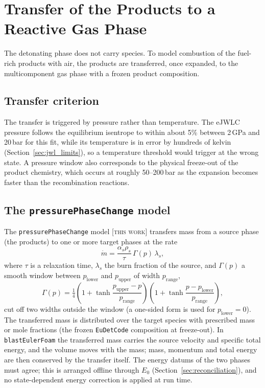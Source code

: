 \documentclass{article}
\newcommand{\tw}{\textsc{[this work]}}
\begin{document}
\section{Transfer of the Products to a Reactive Gas Phase}
\label{sec:transfer}

The detonating phase does not carry species. To model combustion of the fuel-rich products with air, the products are transferred, once expanded, to the multicomponent gas phase with a frozen product composition.

\subsection{Transfer criterion}

The transfer is triggered by pressure rather than temperature. The eJWLC pressure follows the equilibrium isentrope to within about 5\% between 2\,GPa and 20\,bar for this fit, while its temperature is in error by hundreds of kelvin (Section~\ref{sec:jwl_limits}), so a temperature threshold would trigger at the wrong state. A pressure window also corresponds to the physical freeze-out of the product chemistry, which occurs at roughly 50--200\,bar as the expansion becomes faster than the recombination reactions.

\subsection{The \texttt{pressurePhaseChange} model}
\label{sec:ppc}

The \texttt{pressurePhaseChange} model \tw{} transfers mass from a source phase (the products) to one or more target phases at the rate
\begin{equation}
    \dot m = \frac{\alpha_s\rho_s}{\tau}\,\Gamma(p)\,\lambda_s,
\end{equation}
where $\tau$ is a relaxation time, $\lambda_s$ the burn fraction of the source, and $\Gamma(p)$ a smooth window between $p_\text{lower}$ and $p_\text{upper}$ of width $p_\text{range}$,
\begin{equation}
    \Gamma(p) = \tfrac14\left(1 + \tanh\frac{p_\text{upper} - p}{p_\text{range}}\right)\left(1 + \tanh\frac{p - p_\text{lower}}{p_\text{range}}\right),
\end{equation}
cut off two widths outside the window (a one-sided form is used for $p_\text{lower} = 0$). The transferred mass is distributed over the target species with prescribed mass or mole fractions (the frozen \texttt{EuDetCode} composition at freeze-out). In \texttt{blastEulerFoam} the transferred mass carries the source velocity and specific total energy, and the volume moves with the mass; mass, momentum and total energy are then conserved by the transfer itself. The energy datums of the two phases must agree; this is arranged offline through $E_0$ (Section~\ref{sec:reconciliation}), and no state-dependent energy correction is applied at run time.
\end{document}
